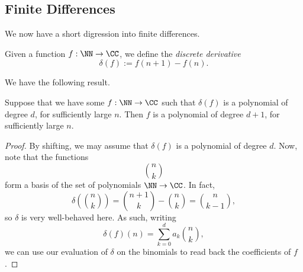 \documentclass[../notes.tex]{subfiles}
\begin{document}
\subsection{Finite Differences}
We now have a short digression into finite differences.
\begin{definition}
	Given a function $f:\NN\to\CC$, we define the \textit{discrete derivative}
	\[\delta(f):=f(n+1)-f(n).\]
\end{definition}
We have the following result.
\begin{lemma} \label{lem:findiffs}
	Suppose that we have some $f:\NN\to\CC$ such that $\delta(f)$ is a polynomial of degree $d$, for sufficiently large $n$. Then $f$ is a polynomial of degree $d+1$, for sufficiently large $n$.
\end{lemma}
\begin{proof}
	By shifting, we may assume that $\delta(f)$ is a polynomial of degree $d$. Now, note that the functions
	\[\binom nk\]
	form a basis of the set of polynomials $\NN\to\CC$. In fact,
	\[\delta\left(\binom nk\right)=\binom{n+1}k-\binom nk=\binom{n}{k-1},\]
	so $\delta$ is very well-behaved here. As such, writing
	\[\delta(f)(n)=\sum_{k=0}^da_k\binom nk,\]
	we can use our evaluation of $\delta$ on the binomials to read back the coefficients of $f$.
\end{proof}
\end{document}
